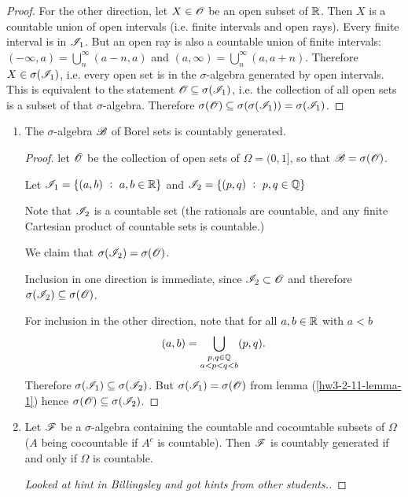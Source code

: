 \begin{enumerate}
\begin{proof}
    For the other direction, let $X \in \mathscr O$ be an open subset of $\mathbb{R}$. Then $X$ is a countable union of
    open intervals (i.e. finite intervals and open rays). Every finite interval is in $\mathscr I_1$. But an open
    ray is also a countable union of finite intervals: $(-\infty, a) = \bigcup_n^\infty (a-n, a)$
    and $(a, \infty) = \bigcup_n^\infty (a, a + n)$. Therefore $X \in \sigma(\mathscr I_1)$, i.e. every open set
    is in the $\sigma$-algebra generated by open intervals. This is equivalent to the
    statement $\mathscr O \subseteq \sigma(\mathscr I_1)$, i.e. the collection of all open sets is a subset of
    that $\sigma$-algebra. Therefore $\sigma(\mathscr O) \subseteq \sigma(\sigma(\mathscr I_1)) = \sigma(\mathscr I_1)$.
  \end{proof}

  \begin{enumerate}[label=(\alph*)]

  \item
    \begin{claim*}
      The $\sigma$-algebra $\mathscr B$ of Borel sets is countably generated.
    \end{claim*}
    \begin{proof}
      let $\mathscr O$ be the collection of open sets of $\Omega = (0, 1]$, so that $\mathscr B = \sigma(\mathscr O)$.

      Let $\mathscr I_1 = \{(a, b) ~:~ a, b \in \mathbb{R}\}$ and $\mathscr I_2 = \{(p, q) ~:~ p, q \in \mathbb{Q}\}$

      Note that $\mathscr I_2$ is a countable set (the rationals are countable, and any finite Cartesian product of
      countable sets is countable.)

      We claim that $\sigma(\mathscr I_2) = \sigma(\mathscr O)$.

      Inclusion in one direction is immediate, since $\mathscr I_2 \subset \mathscr O$ and
      therefore $\sigma(\mathscr I_2) \subseteq\sigma(\mathscr O)$.

      For inclusion in the other direction, note that for all $a, b \in \mathbb{R}$ with $a < b$
      \begin{align*}
        (a, b) = \bigcup_{\substack{p, q \in \mathbb{Q}\\a < p < q < b}} (p, q).
      \end{align*}
      Therefore $\sigma(\mathscr I_1) \subseteq \sigma(\mathscr I_2)$. But $\sigma(\mathscr I_1) = \sigma(\mathscr O)$ from lemma
      (\ref{hw3-2-11-lemma-1}) hence $\sigma(\mathscr O) \subseteq \sigma(\mathscr I_2)$.
    \end{proof}
  \item
    \begin{claim*}
      Let $\mathscr F$ be a $\sigma$-algebra containing the countable and cocountable subsets of $\Omega$ ($A$ being
      cocountable if $A^c$ is countable). Then $\mathscr F$ is countably generated if and only if $\Omega$ is
      countable.
    \end{claim*}
    \begin{proof}
      [Looked at hint in Billingsley and got hints from other students.]


\end{proof}
\end{enumerate}
\end{enumerate}
